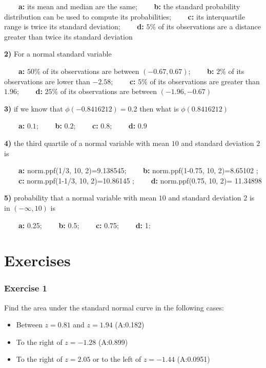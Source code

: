\documentclass[
]{book}
\providecommand{\tightlist}{%
  \setlength{\itemsep}{0pt}\setlength{\parskip}{0pt}}
\begin{document}
\textbf{\(\qquad\)a:} its mean and median are the same; \textbf{\(\qquad\)b:} the standard probability distribution can be used to compute its probabilities; \textbf{\(\qquad\)c:} its interquartile range is twice its standard deviation; \textbf{\(\qquad\)d:} \(5\%\) of its observations are a distance greater than twice its standard deviation

\textbf{2)} For a normal standard variable

\textbf{\(\qquad\)a:} \(50\%\) of its observations are between \((-0.67,0.67)\);
\textbf{\(\qquad\)b:} \(2\%\) of its observations are lower than \(-2.58\);
\textbf{\(\qquad\)c:} \(5\%\) of its observations are greater than \(1.96\);
\textbf{\(\qquad\)d:} \(25\%\) of its observations are between \((-1.96,-0.67)\)

\textbf{3)} if we know that \(\phi(-0.8416212)=0.2\) then what is \(\phi(0.8416212)\)

\textbf{\(\qquad\)a:} \(0.1\);
\textbf{\(\qquad\)b:} \(0.2\);
\textbf{\(\qquad\)c:} \(0.8\);
\textbf{\(\qquad\)d:} \(0.9\)

\textbf{4)} the third quartile of a normal variable with mean \(10\) and standard deviation \(2\) is

\textbf{\(\qquad\)a:} norm.ppf(1/3, 10, 2)=9.138545;
\textbf{\(\qquad\)b:} norm.ppf(1-0.75, 10, 2)=8.65102 ;
\textbf{\(\qquad\)c:} norm.ppf(1-1/3, 10, 2)=10.86145 ;
\textbf{\(\qquad\)d:} norm.ppf(0.75, 10, 2)= 11.34898

\textbf{5)} probability that a normal variable with mean \(10\) and standard deviation \(2\) is in \((-\infty,10)\) is

\textbf{\(\qquad\)a:} 0.25;
\textbf{\(\qquad\)b:} 0.5;
\textbf{\(\qquad\)c:} 0.75;
\textbf{\(\qquad\)d:} 1:

\hypertarget{exercises-7}{%
\section{Exercises}\label{exercises-7}}

\hypertarget{exercise-1-6}{%
\subsubsection{Exercise 1}\label{exercise-1-6}}

Find the area under the standard normal curve in the following cases:

\begin{itemize}
\tightlist
\item
  Between \(z=0.81\) and \(z=1.94\) (A:0.182)
\item
  To the right of \(z=-1.28\) (A:0.899)
\item
  To the right of \(z=2.05\) or to the left of \(z=-1.44\) (A:0.0951)
\end{itemize}
\end{document}
